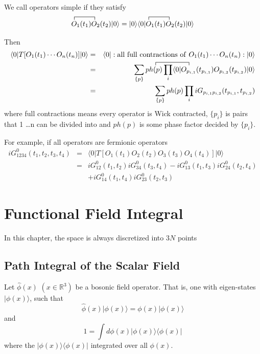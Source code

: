 \documentclass[12pt]{book}
\begin{document}
	We call operators simple if they satisfy
	\begin{equation}
		\contraction{}{O}{{}_1(t_1)}{O}
		\contraction{O_1(t_1)O_2(t_2)|0\rangle=|0\rangle\langle0|}{O}{{}_1(t_1)}{O}
		O_1(t_1)O_2(t_2)|0\rangle=|0\rangle\langle0|O_1(t_1)O_2(t_2)|0\rangle
	\end{equation}
	
	Then
	\begin{eqnarray}
		\langle 0|T[O_1(t_1)\cdots O_n(t_n)]|0\rangle &=&\langle 0|:{\rm all\ full\ contractions\ of\ }O_1(t_1)\cdots O_n(t_n):|0\rangle\\
		\contraction{\qquad\;  \sum_{\{p\}}ph(p)\prod_i\langle0|}{O}{{}_{p_{i,1}}(t_{p_{i,1}})}{O}
		&=&\sum_{\{p\}}ph(p)\prod_i \langle0|O_{p_{i,1}}(t_{p_{i,1}})O_{p_{i,2}}(t_{p_{i,2}})|0\rangle\\
		&=&\sum_{\{p\}}ph(p)\prod_i iG_{p_{i,1}p_{i,2}}(t_{p_{i,1}},t_{p_{i,2}})
	\end{eqnarray}
	where full contractions means every operator is Wick contracted, $\{p_i\}$ is pairs that 1 \dots n can be divided into and $ph(p)$ is some phase factor decided by $\{p_i\}$.
	
	For example, if all operators are fermionic operators
	\begin{eqnarray}
		iG^0_{1234}(t_1,t_2,t_3,t_4)&=&\langle 0|T[O_1(t_1)O_2(t_2)O_3(t_3)O_4(t_4)]|0\rangle\\
		&=&iG^0_{12}(t_1,t_2)iG^0_{34}(t_3,t_4)-iG^0_{13}(t_1,t_3)iG^0_{24}(t_2,t_4)\nonumber\\
		&& +iG^0_{14}(t_1,t_4)iG^0_{23}(t_2,t_3)
	\end{eqnarray}
	
	\chapter{Functional Field Integral}
	
	In this chapter, the space is always discretized into $3N$ points
	
	\section{Path Integral of the Scalar Field}
	
	Let $\hat\phi(x)$ $(x\in\mathbb R^3)$ be a bosonic field operator. That is, one with eigen-states $|\phi(x)\rangle$, such that 
	\begin{equation}
		\hat\phi(x)|\phi(x)\rangle=\phi(x)|\phi(x)\rangle
	\end{equation}
	and 
	\begin{equation}
		1=\int d\phi(x) |\phi(x)\rangle\langle \phi(x)|
	\end{equation}
	where the $|\phi(x)\rangle\langle \phi(x)|$ integrated over all $\phi(x)$.
	
\end{document}
